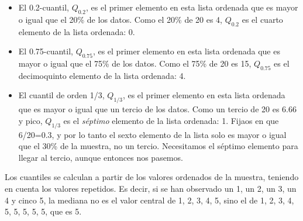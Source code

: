 \documentclass[
  spanish,
  letterpaper,
  DIV=11,
  numbers=noendperiod]{scrreprt}
\begin{document}
\begin{itemize}
\item
  El 0.2-cuantil, \(Q_{0.2}\), es el primer elemento en esta lista
  ordenada que es mayor o igual que el 20\% de los datos. Como el 20\%
  de 20 es 4, \(Q_{0.2}\) es el cuarto elemento de la lista ordenada: 0.
\item
  El 0.75-cuantil, \(Q_{0.75}\), es el primer elemento en esta lista
  ordenada que es mayor o igual que el 75\% de los datos. Como el 75\%
  de 20 es 15, \(Q_{0.75}\) es el decimoquinto elemento de la lista
  ordenada: 4.
\item
  El cuantil de orden 1/3, \(Q_{1/3}\), es el primer elemento en esta
  lista ordenada que es mayor o igual que un tercio de los datos. Como
  un tercio de 20 es 6.66 y pico, \(Q_{1/3}\) es el \emph{séptimo}
  elemento de la lista ordenada: 1. Fijaos en que 6/20=0.3, y por lo
  tanto el sexto elemento de la lista solo es mayor o igual que el 30\%
  de la muestra, no un tercio. Necesitamos el séptimo elemento para
  llegar al tercio, aunque entonces nos pasemos.
\end{itemize}

Los cuantiles se calculan a partir de los valores ordenados de la
muestra, teniendo en cuenta los valores repetidos. Es decir, si se han
observado un 1, un 2, un 3, un 4 y cinco 5, la mediana no es el valor
central de 1, 2, 3, 4, 5, sino el de 1, 2, 3, 4, 5, 5, 5, 5, 5, que es
5.
\end{document}
